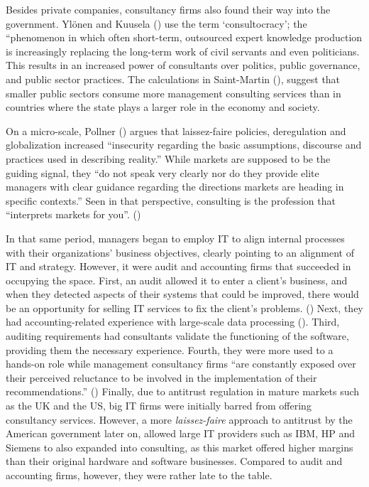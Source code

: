 \documentclass[
  man,floatsintext]{apa6}
\begin{document}
Besides private companies, consultancy firms also found their way into the government. Ylönen and Kuusela () use the term `consultocracy'; the ``phenomenon in which often short-term, outsourced expert knowledge production is increasingly replacing the long-term work of civil servants and even politicians. This results in an increased power of consultants over politics, public governance, and public sector practices. The calculations in Saint-Martin (), suggest that smaller public sectors consume more management consulting services than in countries where the state plays a larger role in the economy and society.

On a micro-scale, Pollner () argues that laissez-faire policies, deregulation and globalization increased ``insecurity regarding the basic assumptions, discourse and practices used in describing reality.'' While markets are supposed to be the guiding signal, they ``do not speak very clearly nor do they provide elite managers with clear guidance regarding the directions markets are heading in specific contexts.'' Seen in that perspective, consulting is the profession that ``interprets markets for you''. ()

In that same period, managers began to employ IT to align internal processes with their organizations' business objectives, clearly pointing to an alignment of IT and strategy. However, it were audit and accounting firms that succeeded in occupying the space. First, an audit allowed it to enter a client's business, and when they detected aspects of their systems that could be improved, there would be an opportunity for selling IT services to fix the client's problems. () Next, they had accounting-related experience with large-scale data processing (). Third, auditing requirements had consultants validate the functioning of the software, providing them the necessary experience. Fourth, they were more used to a hands-on role while management consultancy firms ``are constantly exposed over their perceived reluctance to be involved in the implementation of their recommendations.'' () Finally, due to antitrust regulation in mature markets such as the UK and the US, big IT firms were initially barred from offering consultancy services. However, a more \emph{laissez-faire} approach to antitrust by the American government later on, allowed large IT providers such as IBM, HP and Siemens to also expanded into consulting, as this market offered higher margins than their original hardware and software businesses. Compared to audit and accounting firms, however, they were rather late to the table.
\end{document}
